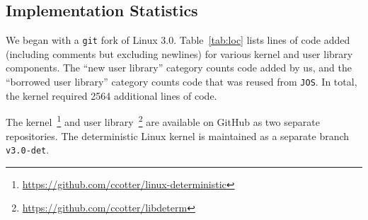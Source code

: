 \subsection{Implementation Statistics}
We began with a {\tt git} fork of Linux 3.0. \mbox{Table \ref{tab:loc}} lists lines
of code added (including comments but excluding newlines) for various kernel and
user library components. The ``new user library'' category counts code added by
us, and the ``borrowed user library'' category counts code that was reused from
{\tt JOS}. In total, the kernel required 2564 additional lines of code.



The kernel~\footnote{
\url{https://github.com/ccotter/linux-deterministic}} and user
library~\footnote{\url{https://github.com/ccotter/libdeterm}} are available on
GitHub as two separate repositories. The deterministic Linux kernel
is maintained as a separate branch {\tt v3.0-det}.

\endinput

